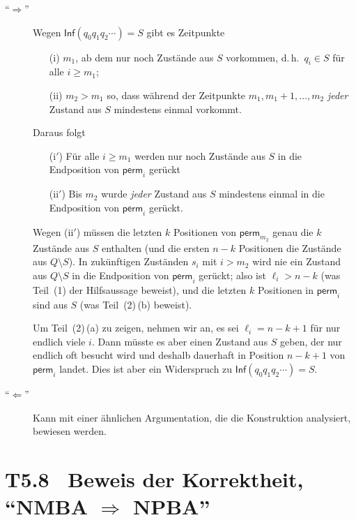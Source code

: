 \documentclass[fontsize=11pt, twoside=false, numbers=autoenddot]{scrbook}
\begin{document}
\begin{description}
  \item[{\boldmath"`$\Rightarrow$"'}]
    Wegen $\textsf{Inf}(q_0q_1q_2\cdots)=S$ gibt es Zeitpunkte
    \begin{enumerate}
      \item[(i)]
        $m_1$, ab dem nur noch Zustände aus $S$ vorkommen,
        d.\,h.\ $q_i \in S$ für alle $i \geq m_1$;
      \item[(ii)]
        $m_2 > m_1$ so, dass während der Zeitpunkte $m_1,m_1+1,\dots,m_2$
        \emph{jeder} Zustand aus $S$ mindestens einmal vorkommt.
    \end{enumerate}
    Daraus folgt
    \begin{enumerate}
      \item[(i$'$)]
        Für alle $i \geq m_1$ werden nur noch Zustände aus $S$ in die Endposition von
        $\textsf{perm}_i$ gerückt
      \item[(ii$'$)]
        Bis $m_2$ wurde \emph{jeder} Zustand aus $S$ mindestens einmal in die 
        Endposition von
        $\textsf{perm}_i$ gerückt.
    \end{enumerate}
    Wegen (ii$'$) müssen die letzten $k$ Positionen von $\textsf{perm}_{m_2}$
    genau die $k$ Zustände aus $S$ enthalten
    (und die ersten $n-k$ Positionen die Zustände aus $Q\setminus S$).
    In zukünftigen Zuständen $s_i$ mit $i > m_2$ wird
    nie ein Zustand aus $Q\setminus S$ in die Endposition von $\textsf{perm}_i$ gerückt;
    also ist $\ell_i  > n-k$ (was Teil~(1) der Hilfsaussage beweist),
    und die letzten $k$ Positionen in $\textsf{perm}_i$ sind aus $S$
    (was Teil~(2)\,(b) beweist).
    
    Um Teil~(2)\,(a) zu zeigen, nehmen wir an, es sei $\ell_i = n-k+1$
    für nur endlich viele $i$.
    Dann müsste es aber einen Zustand aus $S$ geben, der nur endlich oft besucht wird
    und deshalb dauerhaft in Position $n-k+1$ von $\textsf{perm}_i$ landet.
    Dies ist aber ein Widerspruch zu $\textsf{Inf}(q_0q_1q_2\cdots)=S$.
  \item[{\boldmath"`$\Leftarrow$"'}]
    Kann mit einer ähnlichen Argumentation,
    die die Konstruktion analysiert,
    bewiesen werden.
    \qedhere
\end{description}

\pagebreak
\section*{{\boldmath T5.8~ Beweis der Korrektheit, "`NMBA $\Rightarrow$ NPBA"'}}
\end{document}
